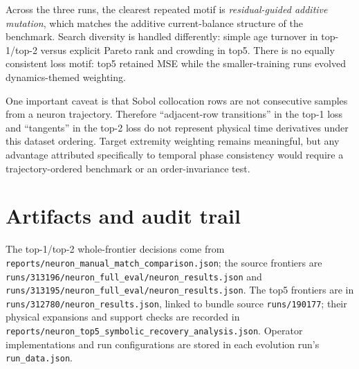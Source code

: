 \documentclass[10pt]{article}
\newcommand{\code}[1]{\nolinkurl{#1}}
\begin{document}
Across the three runs, the clearest repeated motif is \emph{residual-guided additive mutation},
which matches the additive current-balance structure of the benchmark. Search diversity is
handled differently: simple age turnover in top-1/top-2 versus explicit Pareto rank and crowding
in top5. There is no equally consistent loss motif: top5 retained MSE while the smaller-training
runs evolved dynamics-themed weighting.

One important caveat is that Sobol collocation rows are not consecutive samples from a neuron
trajectory. Therefore ``adjacent-row transitions'' in the top-1 loss and ``tangents'' in the
top-2 loss do not represent physical time derivatives under this dataset ordering. Target
extremity weighting remains meaningful, but any advantage attributed specifically to temporal
phase consistency would require a trajectory-ordered benchmark or an order-invariance test.

\section*{Artifacts and audit trail}

The top-1/top-2 whole-frontier decisions come from
\code{reports/neuron_manual_match_comparison.json}; the source frontiers are
\code{runs/313196/neuron_full_eval/neuron_results.json} and
\code{runs/313195/neuron_full_eval/neuron_results.json}. The top5 frontiers are in
\code{runs/312780/neuron_results.json}, linked to bundle source \code{runs/190177}; their
physical expansions and support checks are recorded in
\code{reports/neuron_top5_symbolic_recovery_analysis.json}. Operator implementations and run
configurations are stored in each evolution run's \code{run_data.json}.
\end{document}

